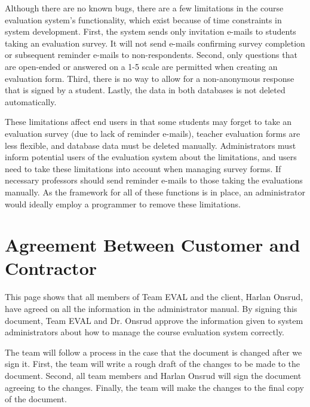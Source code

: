 \documentclass{article}
\begin{document}
Although there are no known bugs, there are a few limitations in the course evaluation system's functionality, which exist because of time constraints in system development. First, the system sends only invitation e-mails to students taking an evaluation survey. It will not send e-mails confirming survey completion or subsequent reminder e-mails to non-respondents. Second, only questions that are open-ended or answered on a 1-5 scale are permitted when creating an evaluation form. Third, there is no way to allow for a non-anonymous response that is signed by a student. Lastly, the data in both databases is not deleted automatically.

These limitations affect end users in that some students may forget to take an evaluation survey (due to lack of reminder e-mails), teacher evaluation forms are less flexible, and database data must be deleted manually. Administrators must inform potential users of the evaluation system about the limitations, and users need to take these limitations into account when managing survey forms. If necessary professors should send reminder e-mails to those taking the evaluations manually. As the framework for all of these functions is in place, an administrator would ideally employ a programmer to remove these limitations.

\appendix

\newpage
\section{Agreement Between Customer and Contractor}

This page shows that all members of Team EVAL and the client, Harlan Onsrud, have agreed on all the information in the administrator manual. By signing this document, Team EVAL and Dr. Onsrud approve the information given to system administrators about how to manage the course evaluation system correctly.

The team will follow a process in the case that the document is changed after we sign it. First, the team will write a rough draft of the changes to be made to the document. Second, all team members and Harlan Onsrud will sign the document agreeing to the changes. Finally, the team will make the changes to the final copy of the document.
\end{document}

